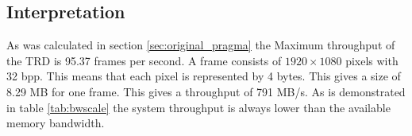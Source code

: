 \subsection{Interpretation}
As was calculated in section \ref{sec:original_pragma} the Maximum throughput of the TRD is 95.37 frames per second. A frame consists of  $1920\times1080$ pixels  with 32 bpp. This means that each pixel is represented by 4 bytes. This gives a size of 8.29 MB for one frame. This gives a throughput of 791 MB/s. As is demonstrated in table \ref{tab:bwscale} the system throughput is always lower than the available memory bandwidth.



